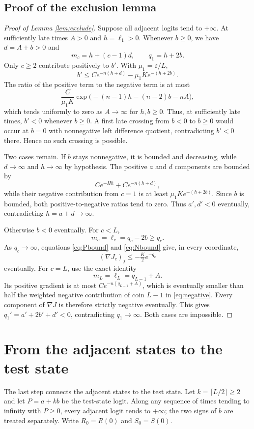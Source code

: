 \documentclass[11pt]{article}
\newcommand{\eps}{\varepsilon}
\newcommand{\grad}{\nabla}
\begin{document}
\subsection{Proof of the exclusion lemma}
\begin{proof}[Proof of Lemma \ref{lem:exclude}]
Suppose all adjacent logits tend to $+\infty$. At sufficiently late times
$A>0$ and $h=\ell_1>0$. Whenever $b\ge0$, we have $d=A+b>0$ and
\[
 m_c=h+(c-1)d,\qquad q_1=h+2b.
\]
Only $c\ge2$ contribute positively to $b'$. With $\mu_1=\eps/L$,
\begin{equation}\label{eq:bdrift}
 b'\le Ce^{-n(h+d)}-\mu_1Ke^{-(h+2b)}.
\end{equation}
The ratio of the positive term to the negative term is at most
\[
 \frac{C}{\mu_1K}\exp\bigl(-(n-1)h-(n-2)b-nA\bigr),
\]
which tends uniformly to zero as $A\to\infty$ for $h,b\ge0$. Thus, at
sufficiently late times, $b'<0$ whenever $b\ge0$. A first late crossing from $b<0$ to $b\ge0$ would occur at $b=0$ with
nonnegative left difference quotient, contradicting $b'<0$ there. Hence
no such crossing is possible.

Two cases remain. If $b$ stays nonnegative, it is bounded and decreasing,
while $d\to\infty$ and $h\to\infty$ by hypothesis. The positive $a$ and $d$ components are bounded by
\[
 Ce^{-Hh}+Ce^{-n(h+d)},
\]
while their negative contribution from $c=1$ is at least
$\mu_1Ke^{-(h+2b)}$. Since $b$ is bounded, both positive-to-negative ratios
tend to zero. Thus $a',d'<0$ eventually, contradicting $h=a+d\to\infty$.

Otherwise $b<0$ eventually. For $c<L$,
\[
 m_c=\ell_c=q_c-2b\ge q_c.
\]
As $q_c\to\infty$, equations \eqref{eq:Pbound} and \eqref{eq:Nbound} give,
in every coordinate,
\begin{equation}\label{eq:negative}
 (\grad J_c)_j\le-\tfrac K2 e^{-q_c}
\end{equation}
eventually. For $c=L$, use the exact identity
\[
 m_L=\ell_L=q_{L-1}+A.
\]
Its positive gradient is at most $Ce^{-n(q_{L-1}+A)}$, which is eventually
smaller than half the weighted negative contribution of coin $L-1$ in
\eqref{eq:negative}. Every component of $\grad J$ is therefore strictly
negative eventually. This gives $q_1'=a'+2b'+d'<0$, contradicting
$q_1\to\infty$. Both cases are impossible.
\end{proof}

\section{From the adjacent states to the test state}
The last step connects the adjacent states to the test state. Let
$k=\lceil L/2\rceil\ge2$ and let $P=a+kb$ be the test-state logit. Along
any sequence of times tending to infinity with $P\ge0$, every adjacent logit
tends to $+\infty$; the two signs of $b$ are treated separately. Write
$R_0=R(0)$ and $S_0=S(0)$.
\end{document}
